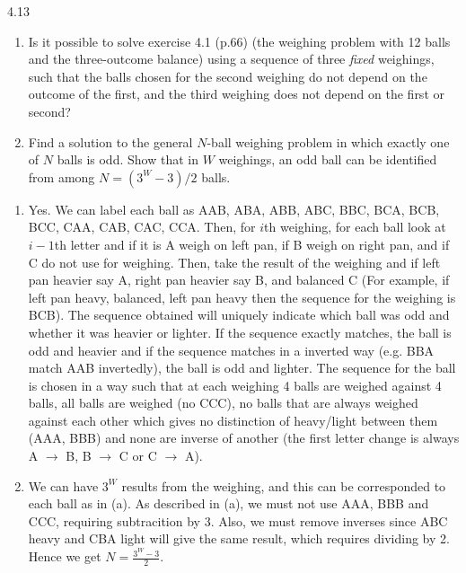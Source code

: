 \documentclass[12pt, a4paper]{article}
\begin{document}
\begin{prob}{4.13}
\begin{enumerate}
    \item[(a)] Is it possible to solve exercise 4.1 (p.66) (the weighing problem with 12 balls and the three-outcome balance) using a
sequence of three \textit{fixed} weighings, such that the balls chosen for the
second weighing do not depend on the outcome of the first, and the
third weighing does not depend on the first or second?
    \item[(b)] Find a solution to the general $N$-ball weighing problem in which
exactly one of $N$ balls is odd. Show that in $W$ weighings, an odd
ball can be identified from among $N = (3^W - 3)/2$ balls.
\end{enumerate}
\end{prob}
\begin{sol}
\begin{enumerate}
    \item[(a)] Yes. We can label each ball as AAB, ABA, ABB, ABC, BBC, BCA, BCB, BCC, CAA, CAB, CAC, CCA.
    Then, for $i$th weighing, for each ball look at $i - 1$th letter and if it is A weigh on left pan, if B weigh on right pan, and if C do not use for weighing.
    Then, take the result of the weighing and if left pan heavier say A, right pan heavier say B, and balanced C (For example, if left pan heavy, balanced, left pan heavy then the sequence for the weighing is BCB).
    The sequence obtained will uniquely indicate which ball was odd and whether it was heavier or lighter. If the sequence exactly matches, the ball is odd and heavier and if the sequence matches in a inverted way (e.g. BBA match AAB invertedly), the ball is odd and lighter.
    The sequence for the ball is chosen in a way such that at each weighing 4 balls are weighed against 4 balls, all balls are weighed (no CCC), no balls that are always weighed against each other which gives no distinction of heavy/light between them (AAA, BBB) and none are inverse of another (the first letter change is always A $\rightarrow$ B, B $\rightarrow$ C or C $\rightarrow$ A).
    \item[(b)] We can have $3^W$ results from the weighing, and this can be corresponded to each ball as in (a).
    As described in (a), we must not use AAA, BBB and CCC, requiring subtracition by 3.
    Also, we must remove inverses since ABC heavy and CBA light will give the same result, which requires dividing by 2.
    Hence we get $N = \frac{3^W - 3}{2}$.
\end{enumerate}
\end{sol}
\bigskip
\end{document}
